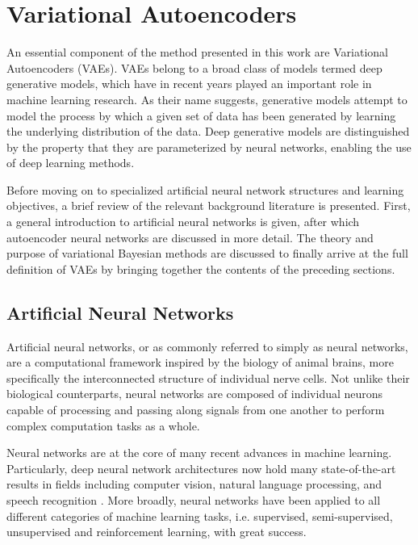 \section{Variational Autoencoders}
\label{section:variational_autoencoders}

An essential component of the method presented in this work are Variational Autoencoders (VAEs). VAEs belong to a broad class of models termed deep generative models, which have in recent years played an important role in machine learning research. As their name suggests, generative models attempt to model the process by which a given set of data has been generated by learning the underlying distribution of the data. Deep generative models are distinguished by the property that they are parameterized by neural networks, enabling the use of deep learning methods.



Before moving on to specialized artificial neural network structures and learning objectives, a brief review of the relevant background literature is presented. First, a general introduction to artificial neural networks is given, after which autoencoder neural networks are discussed in more detail. The theory and purpose of variational Bayesian methods are discussed to finally arrive at the full definition of VAEs by bringing together the contents of the preceding sections.

\subsection{Artificial Neural Networks}
\label{section:artificial_neural_networks}

Artificial neural networks, or as commonly referred to simply as neural networks, are a computational framework inspired by the biology of animal brains, more specifically the interconnected structure of individual nerve cells. Not unlike their biological counterparts, neural networks are composed of individual neurons capable of processing and passing along signals from one another to perform complex computation tasks as a whole.

Neural networks are at the core of many recent advances in machine learning. Particularly, deep neural network architectures now hold many state-of-the-art results in fields including computer vision, natural language processing, and speech recognition \cite{deep_learning}. More broadly, neural networks have been applied to all different categories of machine learning tasks, i.e. supervised, semi-supervised, unsupervised and reinforcement learning, with great success.

